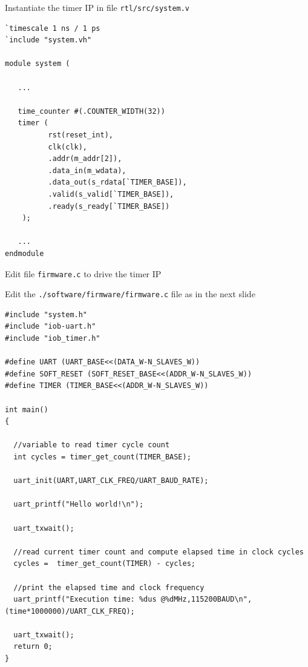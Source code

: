 \documentclass [xcolor=svgnames, t] {beamer}
\begin{document}
\begin{frame}[fragile]{Instantiate the timer IP in file {\tt rtl/src/system.v}}
\begin{tiny}
\begin{lstlisting}
`timescale 1 ns / 1 ps
`include "system.vh"

module system (

   ...

   time_counter #(.COUNTER_WIDTH(32))
   timer (
          rst(reset_int),
          clk(clk),
          .addr(m_addr[2]),
          .data_in(m_wdata),
          .data_out(s_rdata[`TIMER_BASE]),
          .valid(s_valid[`TIMER_BASE]),
          .ready(s_ready[`TIMER_BASE])
    );

   ...
endmodule
\end{lstlisting}
\end{tiny}
\end{frame}


\begin{frame}[fragile]{Edit file {\tt firmware.c} to drive the timer IP}

  Edit the {\tt ./software/firmware/firmware.c} file as in the next slide

\begin{tiny}
\begin{lstlisting}
#include "system.h"
#include "iob-uart.h"
#include "iob_timer.h"

#define UART (UART_BASE<<(DATA_W-N_SLAVES_W))
#define SOFT_RESET (SOFT_RESET_BASE<<(ADDR_W-N_SLAVES_W))
#define TIMER (TIMER_BASE<<(ADDR_W-N_SLAVES_W))

int main()
{ 

  //variable to read timer cycle count
  int cycles = timer_get_count(TIMER_BASE);
  
  uart_init(UART,UART_CLK_FREQ/UART_BAUD_RATE);   

  uart_printf("Hello world!\n");

  uart_txwait();
  
  //read current timer count and compute elapsed time in clock cycles  
  cycles =  timer_get_count(TIMER) - cycles;

  //print the elapsed time and clock frequency
  uart_printf("Execution time: %dus @%dMHz,115200BAUD\n",(time*1000000)/UART_CLK_FREQ);

  uart_txwait();
  return 0;
}
\end{lstlisting}
\end{tiny}
\end{frame}
\end{document}

